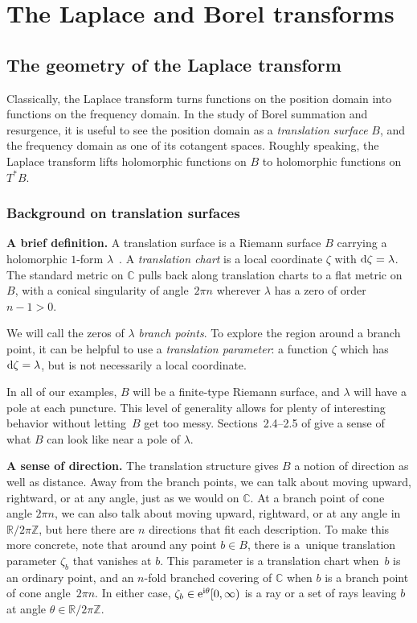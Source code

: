\documentclass[pdftex]{sigma}
\newcommand{\Z}{\mathbb{Z}}
\newcommand{\R}{\mathbb{R}}
\newcommand{\C}{\mathbb{C}}
\numberwithin{equation}{section}
\begin{document}
\section{The Laplace and Borel transforms}\label{sec:Laplace-Borel-general}
\subsection{The geometry of the Laplace transform}\label{sec:geometry_laplace}
Classically, the Laplace transform turns functions on the position domain into functions on the frequency domain. In the study of Borel summation and resurgence, it is useful to see the position domain as a {\em translation surface} $B$, and the frequency domain as one of its cotangent spaces. Roughly speaking, the Laplace transform lifts holomorphic functions on $B$ to holomorphic functions on $T^*B$.
%
\subsubsection{Background on translation surfaces}\label{sec:transl}

{\bf A brief definition.}
%
A translation surface is a Riemann surface $B$ carrying a holomorphic $1$-form $\lambda$~\cite{zorich2006flat}. A {\em translation chart} is a local coordinate $\zeta$ with ${\rm d}\zeta = \lambda$. The standard metric on $\C$ pulls back along translation charts to a flat metric on $B$, with a conical singularity of angle~$2\pi n$ wherever $\lambda$ has a zero of order $n-1 > 0$.

We will call the zeros of $\lambda$ {\em branch points}. To explore the region around a branch point, it can be helpful to use a {\em translation parameter}: a function $\zeta$ which has ${\rm d}\zeta = \lambda$, but is not necessarily a local coordinate.

In all of our examples, $B$ will be a finite-type Riemann surface, and $\lambda$ will have a pole at each puncture. This level of generality allows for plenty of interesting behavior without letting~$B$ get too messy. Sections~2.4--2.5 of \cite{gupta2013meromorphic} give a sense of what $B$ can look like near a pole of $\lambda$.

{\bf A sense of direction.}
The translation structure gives $B$ a notion of direction as well as distance. Away from the branch points, we can talk about moving upward, rightward, or at any angle, just as we would on $\C$. At a branch point of cone angle $2\pi n$, we can also talk about moving upward, rightward, or at any angle in $\R/2\pi\Z$, but here there are $n$ directions that fit each description. To make this more concrete, note that around any point $b \in B$, there is a~unique translation parameter $\zeta_b$ that vanishes at $b$. This parameter is a translation chart when~$b$ is an ordinary point, and an $n$-fold branched covering of $\C$ when $b$ is a branch point of cone angle~$2\pi n$. In either case, $\zeta_b \in {\rm e}^{{\rm i}\theta} [0, \infty)$ is a ray or a set of rays leaving $b$ at angle $\theta \in \R/2\pi\Z$.
\end{document}
